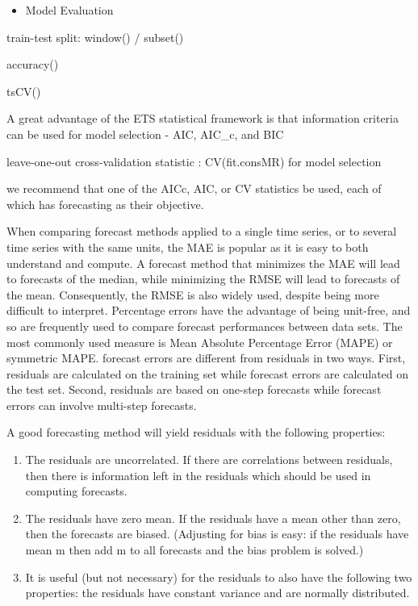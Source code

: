\documentclass[]{book}
\providecommand{\tightlist}{%
  \setlength{\itemsep}{0pt}\setlength{\parskip}{0pt}}
\theoremstyle{definition}
\theoremstyle{definition}
\theoremstyle{definition}
\theoremstyle{remark}
\begin{document}
\begin{itemize}
\tightlist
\item
  Model Evaluation
\end{itemize}

train-test split: window() / subset()

accuracy()

tsCV()

A great advantage of the ETS statistical framework is that information
criteria can be used for model selection - AIC, AIC\_c, and BIC

leave-one-out cross-validation statistic : CV(fit.consMR) for model
selection

we recommend that one of the AICc, AIC, or CV statistics be used, each
of which has forecasting as their objective.

When comparing forecast methods applied to a single time series, or to
several time series with the same units, the MAE is popular as it is
easy to both understand and compute. A forecast method that minimizes
the MAE will lead to forecasts of the median, while minimizing the RMSE
will lead to forecasts of the mean. Consequently, the RMSE is also
widely used, despite being more difficult to interpret. Percentage
errors have the advantage of being unit-free, and so are frequently used
to compare forecast performances between data sets. The most commonly
used measure is Mean Absolute Percentage Error (MAPE) or symmetric MAPE.
forecast errors are different from residuals in two ways. First,
residuals are calculated on the training set while forecast errors are
calculated on the test set. Second, residuals are based on one-step
forecasts while forecast errors can involve multi-step forecasts.

A good forecasting method will yield residuals with the following
properties:

\begin{enumerate}
\def\labelenumi{\arabic{enumi})}
\item
  The residuals are uncorrelated. If there are correlations between
  residuals, then there is information left in the residuals which
  should be used in computing forecasts.
\item
  The residuals have zero mean. If the residuals have a mean other than
  zero, then the forecasts are biased. (Adjusting for bias is easy: if
  the residuals have mean m then add m to all forecasts and the bias
  problem is solved.)
\item
  It is useful (but not necessary) for the residuals to also have the
  following two properties: the residuals have constant variance and are
  normally distributed.
\end{enumerate}
\end{document}
